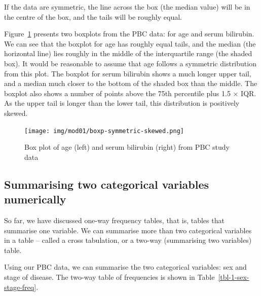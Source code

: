 \documentclass[
  a4paper,
]{memoir}
\begin{document}
If the data are symmetric, the line across the box (the median value)
will be in the centre of the box, and the tails will be roughly equal.

Figure~\ref{fig-box-1} presents two boxplots from the PBC data: for age
and serum bilirubin. We can see that the boxplot for age has roughly
equal tails, and the median (the horizontal line) lies roughly in the
middle of the interquartile range (the shaded box). It would be
reasonable to assume that age follows a symmetric distribution from this
plot. The boxplot for serum bilirubin shows a much longer upper tail,
and a median much closer to the bottom of the shaded box than the
middle. The boxplot also shows a number of points above the 75th
percentile plus 1.5 × IQR. As the upper tail is longer than the lower
tail, this distribution is positively skewed.

\begin{figure}

{\centering \texttt{[image: img/mod01/boxp-symmetric-skewed.png]}

}

\caption{\label{fig-box-1}Box plot of age (left) and serum bilirubin
(right) from PBC study data}

\end{figure}

\hypertarget{summarising-two-categorical-variables-numerically}{%
\subsection{Summarising two categorical variables
numerically}\label{summarising-two-categorical-variables-numerically}}

So far, we have discussed one-way frequency tables, that is, tables that
summarise one variable. We can summarise more than two categorical
variables in a table -- called a cross tabulation, or a two-way
(summarising two variables) table.

Using our PBC data, we can summarise the two categorical variables: sex
and stage of disease. The two-way table of frequencies is shown in
Table~\ref{tbl-1-sex-stage-freq}.

\hypertarget{tbl-1-sex-stage-freq}{}
 
  \providecommand{\huxb}[2]{\arrayrulecolor[RGB]{#1}\global\arrayrulewidth=#2pt}
  \providecommand{\huxvb}[2]{\color[RGB]{#1}\vrule width #2pt}
  \providecommand{\huxtpad}[1]{\rule{0pt}{#1}}
  \providecommand{\huxbpad}[1]{\rule[-#1]{0pt}{#1}}
\end{document}
